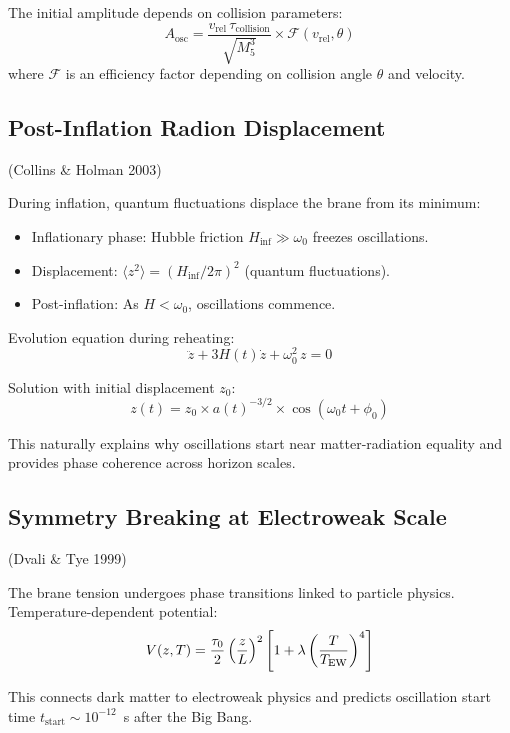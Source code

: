 The initial amplitude depends on collision parameters:
\begin{equation}
A_\text{osc} = \frac{v_\text{rel}\,\tau_\text{collision}}{\sqrt{M_5^3}} \times \mathcal{F}(v_\text{rel}, \theta)
\end{equation}
where $\mathcal{F}$ is an efficiency factor depending on collision angle $\theta$ and velocity.

\subsection{Post-Inflation Radion Displacement}
(Collins \& Holman 2003)

During inflation, quantum fluctuations displace the brane from its minimum:
\begin{itemize}
  \item Inflationary phase: Hubble friction $H_\text{inf} \gg \omega_0$ freezes oscillations.
  \item Displacement: $\langle z^2\rangle = (H_\text{inf}/2\pi)^2$ (quantum fluctuations).
  \item Post-inflation: As $H < \omega_0$, oscillations commence.
\end{itemize}

Evolution equation during reheating:
\begin{equation}
\ddot{z} + 3H(t)\dot{z} + \omega_0^2\,z = 0
\end{equation}

Solution with initial displacement $z_0$:
\begin{equation}
z(t) = z_0 \times a(t)^{-3/2} \times \cos(\omega_0 t + \phi_0)
\end{equation}

This naturally explains why oscillations start near matter-radiation equality and provides phase coherence across horizon scales.

\subsection{Symmetry Breaking at Electroweak Scale}
(Dvali \& Tye 1999)

The brane tension undergoes phase transitions linked to particle physics. Temperature-dependent potential:
\begin{equation}
V(z,T) = \frac{\tau_0}{2}\left(\frac{z}{L}\right)^2\left[1 + \lambda\left(\frac{T}{T_\text{EW}}\right)^4\right]
\end{equation}

This connects dark matter to electroweak physics and predicts oscillation start time $t_\text{start} \sim 10^{-12}$~s after the Big Bang.


